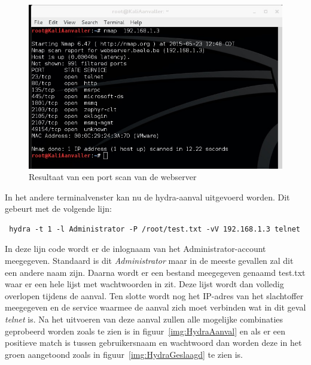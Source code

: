 \documentclass[pdftex,a4paper,12pt]{report}
\begin{document}
\begin{figure}[H]
\begin{center}
\includegraphics[scale=0.60]{img/HydraPortscan}
\end{center}
\caption{Resultaat van een port scan van de webserver}
\label{img:PortScan}
\end{figure}

In het andere terminalvenster kan nu de hydra-aanval uitgevoerd worden. Dit gebeurt met de volgende lijn:
\begin{verbatim} hydra -t 1 -l Administrator -P /root/test.txt -vV 192.168.1.3 telnet \end{verbatim}
In deze lijn code wordt er de inlognaam van het Administrator-account meegegeven. Standaard is dit \textit{Administrator} maar in de meeste gevallen zal dit een andere naam zijn. Daarna wordt er een bestand meegegeven genaamd test.txt waar er een hele lijst met wachtwoorden in zit. Deze lijst wordt dan volledig overlopen tijdens de aanval. Ten slotte wordt nog het IP-adres van het slachtoffer meegegeven en de service waarmee de aanval zich moet verbinden wat in dit geval \textit{telnet} is. Na het uitvoeren van deze aanval zullen alle mogelijke combinaties geprobeerd worden zoals te zien is in figuur~\ref{img:HydraAanval} en als er een positieve match is tussen gebruikersnaam en wachtwoord dan worden deze in het groen aangetoond zoals in figuur~\ref{img:HydraGeslaagd} te zien is. \citep{Moon2013}
\end{document}
